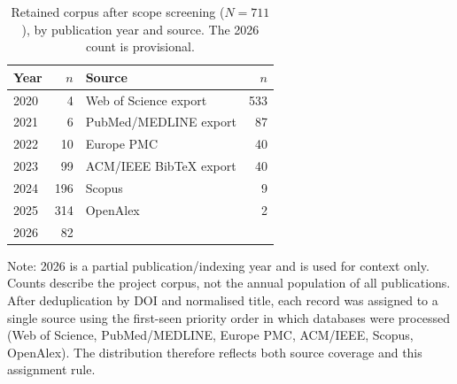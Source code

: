 \documentclass[a4paper,10pt,conference]{IEEEtran}
\begin{document}
\begin{table}[!t]
\caption{Retained corpus after scope screening ($N=711$), by publication year and source. The 2026 count is provisional.}
\label{tab:corpus}
\centering
\footnotesize
\begin{tabular}{lr|lr}
\toprule
Year & $n$ & Source & $n$ \\
\midrule
2020 & 4 & Web of Science export & 533 \\
2021 & 6 & PubMed/MEDLINE export & 87 \\
2022 & 10 & Europe PMC & 40 \\
2023 & 99 & ACM/IEEE BibTeX export & 40 \\
2024 & 196 & Scopus & 9 \\
2025 & 314 & OpenAlex & 2 \\
2026 & 82 & & \\
\bottomrule
\end{tabular}
\par\vspace{3mm}
\begin{minipage}{0.90\columnwidth}
\raggedright\footnotesize Note: 2026 is a partial publication/indexing year and is used for context only. Counts describe the project corpus, not the annual population of all publications. After deduplication by DOI and normalised title, each record was assigned to a single source using the first-seen priority order in which databases were processed (Web of Science, PubMed/MEDLINE, Europe PMC, ACM/IEEE, Scopus, OpenAlex). The distribution therefore reflects both source coverage and this assignment rule.
\end{minipage}
\end{table}
\end{document}
